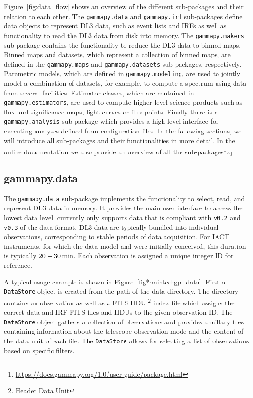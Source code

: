 \documentclass[longauth]{aa}
\newcommand{\code}[1]{\texttt{#1}}
\begin{document}
Figure~\ref{fig:data_flow} shows an overview of the different sub-packages and
their relation to each other. The \code{gammapy.data} and \code{gammapy.irf}
sub-packages define data objects to represent DL3 data, such as
event lists and IRFs as well as functionality
to read the DL3 data from disk into memory. The \code{gammapy.makers} sub-package
contains the functionality to reduce the DL3 data to binned maps.
Binned maps and datasets, which represent a collection of binned
maps, are defined in the \code{gammapy.maps} and \code{gammapy.datasets}
sub-packages, respectively. Parametric models, which are defined in
\code{gammapy.modeling}, are used to jointly model a combination
of datasets, for example, to compute a spectrum using data from several facilities. Estimator classes,
which are contained in \code{gammapy.estimators}, are used to
compute higher level science products such as flux and significance maps,
light curves or flux points. Finally there is a \code{gammapy.analysis}
sub-package which provides a high-level interface for executing analyses
defined from configuration files. In the following sections, we will
introduce all sub-packages and their functionalities in more detail.
In the online documentation we also provide an overview of all
the \gammapy sub-packages\footnote{\url{https://docs.gammapy.org/1.0/user-guide/package.html}}.q


\subsection{gammapy.data}
\label{ssec:gammapy-data}
The \code{gammapy.data} sub-package implements the functionality to select,
read, and represent DL3 \gammaray data in memory. It provides the main user
interface to access the lowest data level. \gammapy currently only
supports data that is compliant with \code{v0.2} and \code{v0.3} of the \gadf data format.
DL3 data are typically bundled into individual observations, corresponding to
stable periods of data acquisition. For IACT instruments, for which the \gadf
data model and \gammapy were initially conceived, this duration is typically 
$20 - 30\,{\rm min}$. Each observation is assigned a unique integer ID for reference.

A typical usage example is shown in Figure~\ref{fig*:minted:gp_data}.
First a \code{DataStore} object is created from the path of the data
directory. The directory contains an observation as well as a FITS HDU \footnote{Header Data Unit} 
index file which assigns the correct data and IRF FITS files and HDUs
to the given observation ID. The \code{DataStore}
object gathers a collection of observations and provides ancillary
files containing information about the telescope observation mode and the
content of the data unit of each file. The \code{DataStore} allows for
selecting a list of observations based on specific filters.
\end{document}
